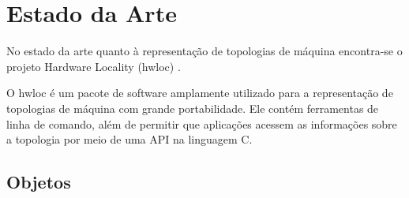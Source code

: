 \chapter{Estado da Arte} %
\label{cap:estado_da_arte}
\acresetall


No estado da arte quanto à representação de topologias de máquina encontra-se o projeto Hardware Locality (hwloc) \cite{hwloc2010}.

O hwloc é um pacote de software amplamente utilizado para a representação de topologias de máquina com grande portabilidade.
Ele contém ferramentas de linha de comando, além de permitir que aplicações acessem as informações sobre a topologia por meio de uma API na linguagem C.



\section{Objetos}
\label{sec:objetos}

